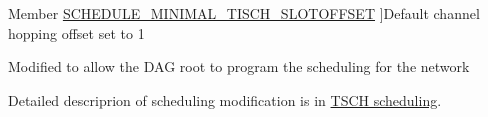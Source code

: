 \begin{DoxyRefList}
Member \hyperlink{group___schedule_ga62c64cb1c9bbbb2927f358c14535fb7f}{S\+C\+H\+E\+D\+U\+L\+E\+\_\+\+M\+I\+N\+I\+M\+A\+L\+\_\+T\+I\+S\+C\+H\+\_\+\+S\+L\+O\+T\+O\+F\+F\+S\+ET} ]Default channel hopping offset set to 1  
\item[\label{_l_k_n_code_edits__LKN_code_edits000003}%
\hypertarget{_l_k_n_code_edits__LKN_code_edits000003}{}%
Member \hyperlink{group___schedule_gade694f312044f8bff151d58c7976d067}{schedule\+\_\+start\+D\+A\+Groot} (void)]Modified to allow the D\+AG root to program the scheduling for the network 
\item[\label{_l_k_n_code_edits__LKN_code_edits000005}%
\hypertarget{_l_k_n_code_edits__LKN_code_edits000005}{}%
Member \hyperlink{group___schedule_gaea12b586ec3f6de3ffcfff93da574345}{S\+L\+O\+T\+F\+R\+A\+M\+E\+\_\+\+L\+E\+N\+G\+TH} ]Detailed descriprion of scheduling modification is in \hyperlink{_l_k_n_contribution_TSCH_scheduling}{T\+S\+CH scheduling}.
\end{DoxyRefList}